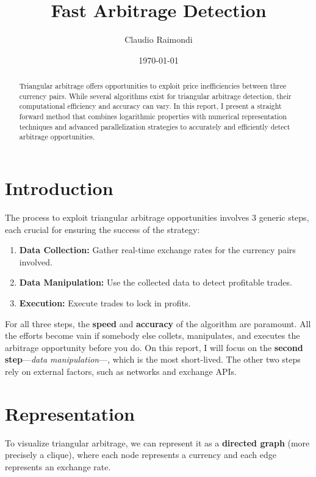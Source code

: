 \documentclass[11pt]{article}
\begin{document}
\title{Fast Arbitrage Detection}
\author{Claudio Raimondi}
\date{\today}
\maketitle

\begin{abstract}
Triangular arbitrage offers opportunities to exploit price inefficiencies between three currency pairs. While several algorithms exist for triangular arbitrage detection, their computational efficiency and accuracy can vary. In this report, I present a straight forward method that combines logarithmic properties with numerical representation techniques and advanced parallelization strategies to accurately and efficiently detect arbitrage opportunities.
\end{abstract}

\tableofcontents

\section{Introduction}
The process to exploit triangular arbitrage opportunities involves 3 generic steps, each crucial for ensuring the success of the strategy:
\begin{enumerate}
    \item \textbf{Data Collection:} Gather real-time exchange rates for the currency pairs involved.
    \item \textbf{Data Manipulation:} Use the collected data to detect profitable trades.
    \item \textbf{Execution:} Execute trades to lock in profits.
\end{enumerate}
For all three steps, the \textbf{speed} and \textbf{accuracy} of the algorithm are paramount. All the efforts become vain if somebody else collets, manipulates, and executes the arbitrage opportunity before you do.
On this report, I will focus on the \textbf{second step}---\textit{data manipulation}---, which is the most short-lived. The other two steps rely on external factors, such as networks and exchange APIs.

\section{Representation}
To visualize triangular arbitrage, we can represent it as a \textbf{directed graph} (more precisely a clique), where each node represents a currency and each edge represents an exchange rate.
\end{document}
